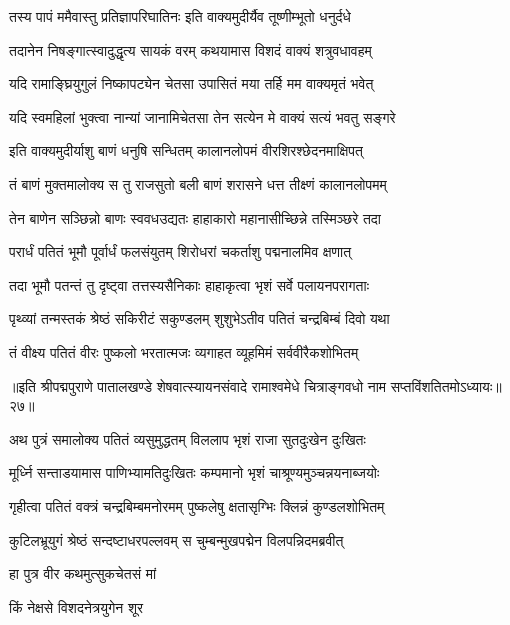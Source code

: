 \twolineshloka
{तस्य पापं ममैवास्तु प्रतिज्ञापरिघातिनः}
{इति वाक्यमुदीर्यैव तूष्णीम्भूतो धनुर्दधे}%

\twolineshloka
{तदानेन निषङ्गात्स्वादुद्धृत्य सायकं वरम्}
{कथयामास विशदं वाक्यं शत्रुवधावहम्}%


\twolineshloka
{यदि रामाङ्घ्रियुगुलं निष्कापट्येन चेतसा}
{उपासितं मया तर्हि मम वाक्यमृतं भवेत्}%

\twolineshloka
{यदि स्वमहिलां भुक्त्वा नान्यां जानामिचेतसा}
{तेन सत्येन मे वाक्यं सत्यं भवतु सङ्गरे}%

\twolineshloka
{इति वाक्यमुदीर्याशु बाणं धनुषि सन्धितम्}
{कालानलोपमं वीरशिरश्छेदनमाक्षिपत्}%

\twolineshloka
{तं बाणं मुक्तमालोक्य स तु राजसुतो बली}
{बाणं शरासने धत्त तीक्ष्णं कालानलोपमम्}%

\twolineshloka
{तेन बाणेन सञ्छिन्नो बाणः स्ववधउद्यतः}
{हाहाकारो महानासीच्छिन्ने तस्मिञ्छरे तदा}%

\twolineshloka
{परार्धं पतितं भूमौ पूर्वार्धं फलसंयुतम्}
{शिरोधरां चकर्ताशु पद्मनालमिव क्षणात्}%

\twolineshloka
{तदा भूमौ पतन्तं तु दृष्ट्वा तत्तस्यसैनिकाः}
{हाहाकृत्वा भृशं सर्वे पलायनपरागताः}%

\twolineshloka
{पृथ्व्यां तन्मस्तकं श्रेष्ठं सकिरीटं सकुण्डलम्}
{शुशुभेऽतीव पतितं चन्द्रबिम्बं दिवो यथा}%

\twolineshloka
{तं वीक्ष्य पतितं वीरः पुष्कलो भरतात्मजः}
{व्यगाहत व्यूहमिमं सर्ववीरैकशोभितम्}%

॥इति श्रीपद्मपुराणे पातालखण्डे शेषवात्स्यायनसंवादे रामाश्वमेधे चित्राङ्गवधो नाम सप्तविंशतितमोऽध्यायः॥२७॥



\twolineshloka
{अथ पुत्रं समालोक्य पतितं व्यसुमुद्धतम्}
{विललाप भृशं राजा सुतदुःखेन दुःखितः}%

\twolineshloka
{मूर्ध्नि सन्ताडयामास पाणिभ्यामतिदुःखितः}
{कम्पमानो भृशं चाश्रूण्यमुञ्चन्नयनाब्जयोः}%

\twolineshloka
{गृहीत्वा पतितं वक्त्रं चन्द्रबिम्बमनोरमम्}
{पुष्कलेषु क्षतासृग्भिः क्लिन्नं कुण्डलशोभितम्}%

\twolineshloka
{कुटिलभ्रूयुगं श्रेष्ठं सन्दष्टाधरपल्लवम्}
{स चुम्बन्मुखपद्मेन विलपन्निदमब्रवीत्}%

हा पुत्र वीर कथमुत्सुकचेतसं मां

किं नेक्षसे विशदनेत्रयुगेन शूर

